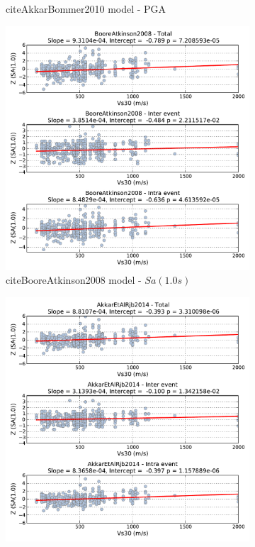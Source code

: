 \begin{figure}[htb]
\begin{subfigure}[b]{0.49\textwidth}
      \caption{citeAkkarBommer2010 model - PGA}
      \label{fig:pga_vs30_akkar2014}
  \end{subfigure}
    \begin{subfigure}[b]{0.49\textwidth}
      \includegraphics[width=\textwidth]{./figures/residuals/BA2008_Vs30_Sa1.pdf}
      \caption{citeBooreAtkinson2008 model - $Sa \left( {1.0 s} \right)$}
      \label{fig:sa1_vs30_ba2008}
  \end{subfigure}
      \begin{subfigure}[b]{0.49\textwidth}
      \includegraphics[width=\textwidth]{./figures/residuals/Akkar2014_Vs30_Sa1.pdf}

\end{subfigure}
\end{figure}
